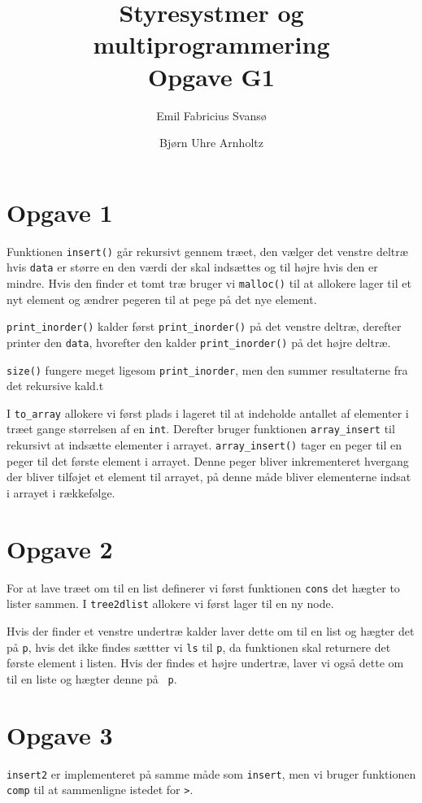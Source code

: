 \documentclass[a4paper]{article}
\title{Styresystmer og multiprogrammering\\ Opgave G1}
\author{Emil Fabricius Svansø \and Bjørn Uhre Arnholtz}
\begin{document}
\maketitle

\section*{Opgave 1}

Funktionen {\tt insert()} går rekursivt gennem træet, den vælger det venstre
deltræ hvis {\tt data} er større en den værdi der skal indsættes og til
højre hvis den er mindre. Hvis den finder et tomt træ bruger vi {\tt malloc()}
til at allokere lager til et nyt element og ændrer pegeren til at pege på det
nye element.

{\tt print\_inorder()} kalder først {\tt print\_inorder()} på det venstre deltræ,
derefter printer den {\tt data}, hvorefter den kalder {\tt print\_inorder()} på
det højre  deltræ.

{\tt size()} fungere meget ligesom {\tt print\_inorder}, men den summer
resultaterne fra det rekursive kald.t

I {\tt to\_array} allokere vi først plads i lageret til at indeholde antallet
af elementer i træet gange størrelsen af en {\tt int}. Derefter bruger
funktionen {\tt array\_insert} til rekursivt at indsætte elementer i arrayet.
{\tt array\_insert()} tager en peger til en peger til det første element i
arrayet. Denne peger bliver inkrementeret hvergang der bliver tilføjet et
element til arrayet, på denne måde bliver elementerne indsat i arrayet i
rækkefølge.

\section*{Opgave 2}

For at lave træet om til en list definerer vi først funktionen {\tt cons} det
hægter to lister sammen. I {\tt tree2dlist} allokere vi først lager til en ny
node.

Hvis der finder et venstre undertræ kalder laver dette om til en list og
hægter det på {\tt p}, hvis det ikke findes sættter vi {\tt ls} til {\tt p},
da funktionen skal returnere det første element i listen. Hvis der findes et
højre undertræ, laver vi også dette om til en liste og hægter denne på {\tt
p}.

\section*{Opgave 3}

{\tt insert2} er implementeret på samme måde som {\tt insert}, men vi bruger
funktionen {\tt comp} til at sammenligne istedet for {\tt >}.
\end{document}
